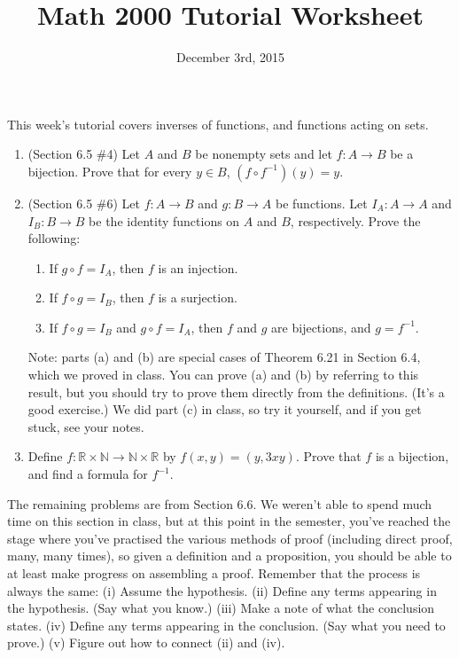 \documentclass[letterpaper,12pt]{article}
\title{Math 2000 Tutorial Worksheet}
\date{December 3rd, 2015}
\begin{document}
\maketitle

 This week's tutorial covers inverses of functions, and functions acting on sets.
\begin{enumerate}
 \item (Section 6.5 \#4) Let $A$ and $B$ be nonempty sets and let $f:A\to B$ be a bijection. Prove that for every $y\in B$, $(f\circ f^{-1})(y) = y$.
 \item (Section 6.5 \#6) Let $f:A\to B$ and $g:B\to A$ be functions. Let $I_A:A\to A$ and $I_B:B\to B$ be the identity functions on $A$ and $B$, respectively. Prove the following:
\begin{enumerate}
 \item If $g\circ f = I_A$, then $f$ is an injection.
 \item If $f\circ g = I_B$, then $f$ is a surjection.
 \item If $f\circ g = I_B$ and $g\circ f = I_A$, then $f$ and $g$ are bijections, and $g=f^{-1}$.
\end{enumerate}
Note: parts (a) and (b) are special cases of Theorem 6.21 in Section 6.4, which we proved in class. You can prove (a) and (b) by referring to this result, but you should try to prove them directly from the definitions. (It's a good exercise.) We did part (c) in class, so try it yourself, and if you get stuck, see your notes.

 \item Define $f:\mathbb{R}\times\mathbb{N}\to\mathbb{N}\times\mathbb{R}$ by $f(x,y) = (y,3xy)$. Prove that $f$ is a bijection, and find a formula for $f^{-1}$.
\end{enumerate}

\vspace{24pt}

The remaining problems are from Section 6.6. We weren't able to spend much time on this section in class, but at this point in the semester, you've reached the stage where you've practised the various methods of proof (including direct proof, many, many times), so given a definition and a proposition, you should be able to at least make progress on assembling a proof. Remember that the process is always the same: (i) Assume the hypothesis. (ii) Define any terms appearing in the hypothesis. (Say what you know.) (iii) Make a note of what the conclusion states. (iv) Define any terms appearing in the conclusion. (Say what you need to prove.) (v) Figure out how to connect (ii) and (iv).
\end{document}

